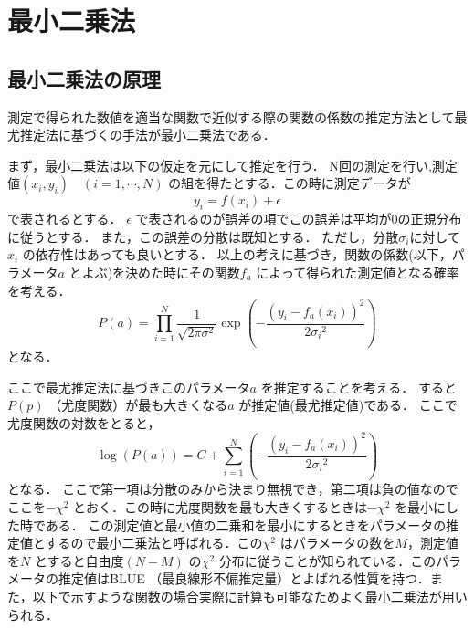 \section{最小二乗法}

\subsection{最小二乗法の原理}
測定で得られた数値を適当な関数で近似する際の関数の係数の推定方法として最尤推定法に基づくの手法が最小二乗法である．

まず，最小二乗法は以下の仮定を元にして推定を行う．
N回の測定を行い,測定値$(x_i,y_i)\quad(i=1,\cdots,N)$ の組を得たとする．この時に測定データが
\begin{equation}
y_i = f(x_i) + \epsilon
\end{equation}
で表されるとする．
$\epsilon$ で表されるのが誤差の項でこの誤差は平均が0の正規分布に従うとする．
また，この誤差の分散は既知とする．
ただし，分散$\sigma_i$に対して$x_i$ の依存性はあっても良いとする．
以上の考えに基づき，関数の係数(以下，パラメータ$a$ とよぶ)を決めた時にその関数$f_a$ によって得られた測定値となる確率を考える．
\begin{equation}
P(a) = \prod_{i=1}^N \frac{1}{\sqrt{2\pi\sigma^2}}\exp\left(-\frac{(y_i-f_a(x_i))^2}{2{\sigma_i}^2}\right)
\end{equation}
となる．

ここで最尤推定法に基づきこのパラメータ$a$ を推定することを考える．
すると$P(p)$ （尤度関数）が最も大きくなる$a$ が推定値(最尤推定値)である．
ここで尤度関数の対数をとると，
\begin{equation}
  \log(P(a)) = C + \sum_{i=1}^N \left(-\frac{(y_i-f_a(x_i))^2}{2{\sigma_i}^2}\right)
\end{equation}
となる．
ここで第一項は分散のみから決まり無視でき，第二項は負の値なのでここを$-\chi^2$ とおく．この時に尤度関数を最も大きくするときは$-\chi^2$ を最小にした時である．
この測定値と最小値の二乗和を最小にするときをパラメータの推定値とするので最小二乗法と呼ばれる．この$\chi^2$ はパラメータの数を$M$，測定値を$N$ とすると自由度$(N-M)$ の$\chi^2$ 分布に従うことが知られている．このパラメータの推定値はBLUE （最良線形不偏推定量）とよばれる性質を持つ．また，以下で示すような関数の場合実際に計算も可能なためよく最小二乗法が用いられる．

